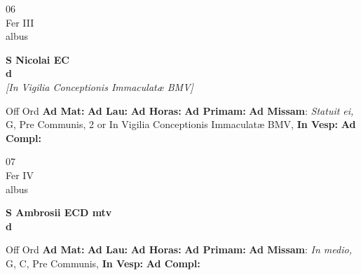 \documentclass[10pt, openany]{book}
\begin{document}
        \begin{center}
            \begin{minipage}{3.5in}
                \vspace{2em}
                \begin{minipage}{0.5in}
                    {\Huge 06} \\
                    {\normalsize Fer III} \\
                    {\normalsize albus}
                \end{minipage}
                \begin{minipage}{3.0in}
                    \textbf{ \large S Nicolai EC \\
                    \textnormal{\normalsize d}} \\ \textit{[In Vigilia Conceptionis Immaculatæ BMV]} \\ 
                \end{minipage}
                \begin{justify}Off Ord
                    \textbf{Ad Mat: }
                    \textbf{Ad Lau: }
                    \textbf{Ad Horas: }
                    \textbf{Ad Primam: }\textbf{Ad Missam}: \textit{Statuit ei,} G, Pre Communis, 2 or In Vigilia Conceptionis Immaculatæ BMV,  
                    \textbf{In Vesp: }
                    \textbf{Ad Compl: }
                \end{justify}
            \end{minipage}
        \end{center}
    
        \begin{center}
            \begin{minipage}{3.5in}
                \vspace{2em}
                \begin{minipage}{0.5in}
                    {\Huge 07} \\
                    {\normalsize Fer IV} \\
                    {\normalsize albus}
                \end{minipage}
                \begin{minipage}{3.0in}
                    \textbf{ \large S Ambrosii ECD mtv \\
                    \textnormal{\normalsize d}} \\ 
                \end{minipage}
                \begin{justify}Off Ord
                    \textbf{Ad Mat: }
                    \textbf{Ad Lau: }
                    \textbf{Ad Horas: }
                    \textbf{Ad Primam: }\textbf{Ad Missam}: \textit{In medio,} G, C, Pre Communis,  
                    \textbf{In Vesp: }
                    \textbf{Ad Compl: }
                \end{justify}
            \end{minipage}
        \end{center}
    
\end{document}
